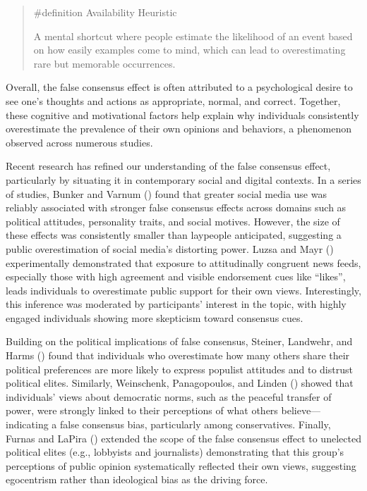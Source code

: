 \documentclass[
  letterpaper,
]{book}
\begin{document}
\begin{quote}
\label{def-availabilityheuristic}{\#definition}
Availability Heuristic

A mental shortcut where people estimate the likelihood of an event based
on how easily examples come to mind, which can lead to overestimating
rare but memorable occurrences.
\end{quote}

Overall, the false consensus effect is often attributed to a
psychological desire to see one's thoughts and actions as appropriate,
normal, and correct. Together, these cognitive and motivational factors
help explain why individuals consistently overestimate the prevalence of
their own opinions and behaviors, a phenomenon observed across numerous
studies.

Recent research has refined our understanding of the false consensus
effect, particularly by situating it in contemporary social and digital
contexts. In a series of studies, Bunker and Varnum
() found that greater social media
use was reliably associated with stronger false consensus effects across
domains such as political attitudes, personality traits, and social
motives. However, the size of these effects was consistently smaller
than laypeople anticipated, suggesting a public overestimation of social
media's distorting power. Luzsa and Mayr
() experimentally demonstrated that
exposure to attitudinally congruent news feeds, especially those with
high agreement and visible endorsement cues like ``likes'', leads
individuals to overestimate public support for their own views.
Interestingly, this inference was moderated by participants' interest in
the topic, with highly engaged individuals showing more skepticism
toward consensus cues.

Building on the political implications of false consensus, Steiner,
Landwehr, and Harms () found that
individuals who overestimate how many others share their political
preferences are more likely to express populist attitudes and to
distrust political elites. Similarly, Weinschenk, Panagopoulos, and
Linden () showed that
individuals' views about democratic norms, such as the peaceful transfer
of power, were strongly linked to their perceptions of what others
believe---indicating a false consensus bias, particularly among
conservatives. Finally, Furnas and LaPira
() extended the scope of the
false consensus effect to unelected political elites (e.g., lobbyists
and journalists) demonstrating that this group's perceptions of public
opinion systematically reflected their own views, suggesting egocentrism
rather than ideological bias as the driving force.
\end{document}
